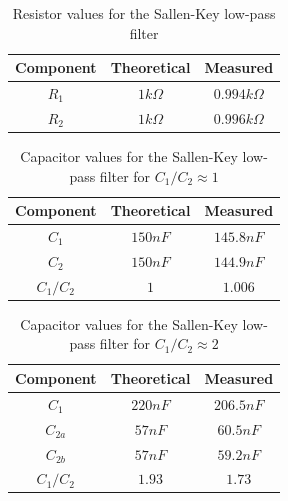 \documentclass{scrartcl}
\begin{document}
\begin{table}[H]
    \centering
    \begin{tabular}{|c|c|c|} \hline
        \textbf{Component} & \textbf{Theoretical} & \textbf{Measured} \\ \hline
        $R_{1}$ & $1k\Omega$ & $0.994k\Omega$ \\ \hline
        $R_{2}$ & $1k\Omega$ & $0.996k\Omega$ \\ \hline
		
    \end{tabular}
    \caption{Resistor values for the Sallen-Key low-pass filter}
    \label{sallen_resistor_values}
\end{table}



\begin{table}[H]
    \centering
    \begin{tabular}{|c|c|c|} \hline
        \textbf{Component} & \textbf{Theoretical} & \textbf{Measured} \\ \hline
        $C_1$ & $150nF$ & $145.8nF$ \\ \hline 
		$C_2$ & $150nF$ & $144.9nF$ \\ \hline
		$C_1/C_2$ & $1$ & $1.006$ \\ \hline
    \end{tabular}
    \caption{Capacitor values for the Sallen-Key low-pass filter for $C_1/C_2 \approx 1$}
    \label{sallen_component_values_1}
\end{table}

\begin{table}[H]
    \centering
    \begin{tabular}{|c|c|c|} \hline
        \textbf{Component} & \textbf{Theoretical} & \textbf{Measured} \\ \hline
        $C_1$ & $220nF$ & $206.5nF$ \\ \hline 
		$C_{2a}$ & $57nF$ & $60.5nF$ \\ \hline
		$C_{2b}$ & $57nF$ & $59.2nF$ \\ \hline
		$C_1/C_2$ & $1.93$ & $1.73$ \\ \hline
    \end{tabular}
    \caption{Capacitor values for the Sallen-Key low-pass filter for $C_1/C_2 \approx 2$}
    \label{sallen_component_values_2}
\end{table}
\end{document}
